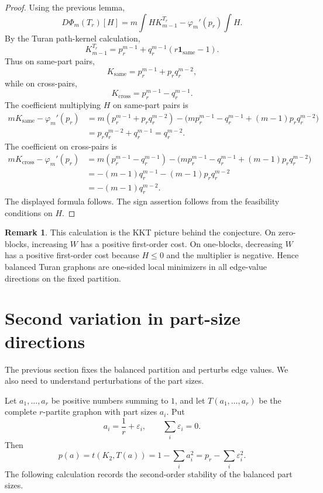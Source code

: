 \documentclass[11pt]{article}
\theoremstyle{definition}
\newtheorem{remark}[theorem]{Remark}
\newcommand{\eps}{\varepsilon}
\newcommand{\same}{\mathrm{same}}
\newcommand{\cross}{\mathrm{cross}}
\begin{document}
\begin{proof}
Using the previous lemma,
\[
        D\Phi_m(T_r)[H]
        =m\int H K_{m-1}^{T_r}-\varphi_m'(p_r)\int H.
\]
By the Turan path-kernel calculation,
\[
        K_{m-1}^{T_r}=p_r^{m-1}+q_r^{m-1}(r\mathbf 1_{\same}-1).
\]
Thus on same-part pairs,
\[
        K_{\same}=p_r^{m-1}+p_rq_r^{m-2},
\]
while on cross-pairs,
\[
        K_{\cross}=p_r^{m-1}-q_r^{m-1}.
\]
The coefficient multiplying $H$ on same-part pairs is
\[
\begin{aligned}
        mK_{\same}-\varphi_m'(p_r)
        &=m(p_r^{m-1}+p_rq_r^{m-2})
          -\bigl(mp_r^{m-1}-q_r^{m-1}+(m-1)p_rq_r^{m-2}\bigr)\\
        &=p_rq_r^{m-2}+q_r^{m-1}=q_r^{m-2}.
\end{aligned}
\]
The coefficient on cross-pairs is
\[
\begin{aligned}
        mK_{\cross}-\varphi_m'(p_r)
        &=m(p_r^{m-1}-q_r^{m-1})
          -\bigl(mp_r^{m-1}-q_r^{m-1}+(m-1)p_rq_r^{m-2}\bigr)\\
        &=-(m-1)q_r^{m-1}-(m-1)p_rq_r^{m-2}\\
        &=-(m-1)q_r^{m-2}.
\end{aligned}
\]
The displayed formula follows.  The sign assertion follows from the feasibility conditions on $H$.
\end{proof}

\begin{remark}
This calculation is the KKT picture behind the conjecture.  On zero-blocks, increasing $W$ has a positive first-order cost.  On one-blocks, decreasing $W$ has a positive first-order cost because $H\le0$ and the multiplier is negative.  Hence balanced Turan graphons are one-sided local minimizers in all edge-value directions on the fixed partition.
\end{remark}

\section{Second variation in part-size directions}

The previous section fixes the balanced partition and perturbs edge values.  We also need to understand perturbations of the part sizes.

Let $a_1,\ldots,a_r$ be positive numbers summing to $1$, and let $T(a_1,\ldots,a_r)$ be the complete $r$-partite graphon with part sizes $a_i$.  Put
\[
        a_i=\frac1r+\eps_i,
        \qquad
        \sum_i\eps_i=0.
\]
Then
\[
        p(a)=t(K_2,T(a))=1-\sum_i a_i^2=p_r-\sum_i\eps_i^2.
\]
The following calculation records the second-order stability of the balanced part sizes.
\end{document}
